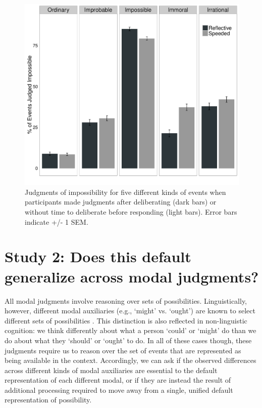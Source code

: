\documentclass[9pt,twocolumn,twoside]{pnas-new}
\begin{document}
\begin{figure}%
\centering
\includegraphics[width=.9\linewidth]{fig1}
\caption{Judgments of impossibility for five different kinds of events when participants made judgments after deliberating (dark bars) or without time to deliberate before responding (light bars). Error bars indicate +/- 1 SEM.}
\label{fig:fig1}
\end{figure}

\section*{Study 2: Does this default generalize across modal judgments?}

All modal judgments involve reasoning over sets of possibilities. Linguistically, however, different modal auxiliaries (e.g., `might' vs. `ought') are known to select different sets of possibilities \citep{portner2009modality,kratzer2012modals}. This distinction is also reflected in non-linguistic cognition: we think differently about what a person `could' or `might' do than we do about what they `should' or `ought' to do. In all of these cases though, these judgments require us to reason over the set of events that are represented as being available in the context. Accordingly, we can ask if the observed differences across different kinds of modal auxiliaries are essential to the default representation of each different modal, or if they are instead the result of additional processing required to move away from a single, unified default representation of possibility.
\end{document}
